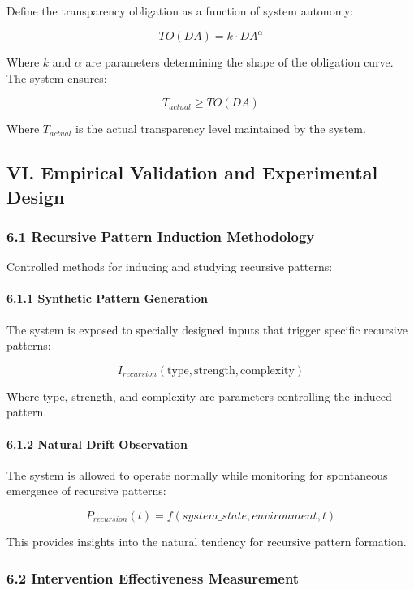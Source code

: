 \documentclass[
]{article}
\begin{document}
Define the transparency obligation as a function of system autonomy:

\[TO(DA) = k \cdot DA^{\alpha}\]

Where \(k\) and \(\alpha\) are parameters determining the shape of the
obligation curve. The system ensures:

\[T_{actual} \geq TO(DA)\]

Where \(T_{actual}\) is the actual transparency level maintained by the
system.

\subsection{VI. Empirical Validation and Experimental
Design}\label{vi.-empirical-validation-and-experimental-design}

\subsubsection{6.1 Recursive Pattern Induction
Methodology}\label{recursive-pattern-induction-methodology}

Controlled methods for inducing and studying recursive patterns:

\paragraph{6.1.1 Synthetic Pattern
Generation}\label{synthetic-pattern-generation}

The system is exposed to specially designed inputs that trigger specific
recursive patterns:

\[I_{recursion}(\text{type}, \text{strength}, \text{complexity})\]

Where type, strength, and complexity are parameters controlling the
induced pattern.

\paragraph{6.1.2 Natural Drift
Observation}\label{natural-drift-observation}

The system is allowed to operate normally while monitoring for
spontaneous emergence of recursive patterns:

\[P_{recursion}(t) = f(system\_state, environment, t)\]

This provides insights into the natural tendency for recursive pattern
formation.

\subsubsection{6.2 Intervention Effectiveness
Measurement}\label{intervention-effectiveness-measurement}
\end{document}
